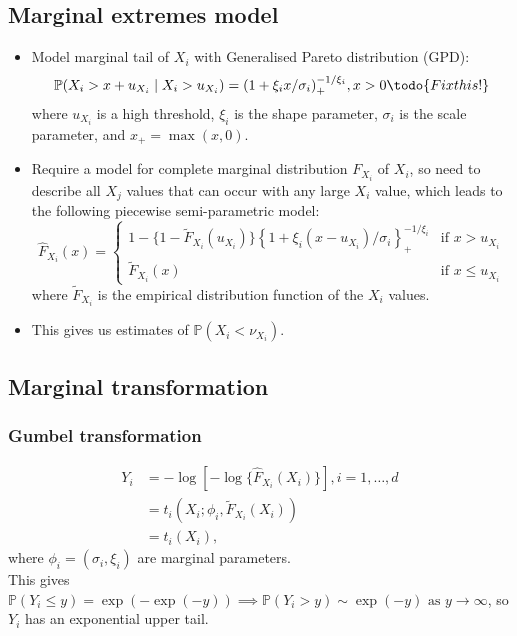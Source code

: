 \documentclass{article}
\begin{document}
\subsection{Marginal extremes model}

\begin{itemize}
  \item Model marginal tail of $X_i$ with Generalised Pareto distribution (GPD):
    \[
      \mathbb{P}(X_i > x + u_{X_i} \mid X_i > u_{X_i}) = {(1 + \xi_ix/\sigma_i)}_{+}^{-1/\xi_i}, x > 0 \todo{Fix this!}
    \]
    where $u_{X_i}$ is a high threshold, $\xi_i$ is the shape parameter, $\sigma_i$ is the scale parameter, and ${x}_{+} = \max(x, 0)$.
  \item Require a model for complete marginal distribution $F_{X_i}$  of $X_i$, so need to describe all $X_j$ values that can occur with any large $X_i$ value, which leads to the following piecewise semi-parametric model:
    \[
      \hat{F}_{X_i}(x) = \begin{cases}
        1 - \{ 1 - \tilde{F}_{X_i}(u_{X_i})\} \left\{1 + \xi_i(x - u_{X_i})/\sigma_i\right\}_{+}^{-1/\xi_i} & \text{if } x > u_{X_i} \\
        \tilde{F}_{X_i}(x) & \text{if } x \le u_{X_i}
      \end{cases}
    \]
    where $\tilde{F}_{X_i}$ is the empirical distribution function of the $X_i$ values. 
  \item This gives us estimates of $\mathbb{P}(X_i < \nu_{X_i})$.
\end{itemize}

\subsection{Marginal transformation}


\subsubsection{Gumbel transformation}

\begin{align*}
  Y_i &= -\log[-\log\{\hat{F}_{X_i}(X_i)\}], i = 1, \ldots, d \\
      &= t_i(X_i; \phi_i, \tilde{F}_{X_i}(X_i)) \\
      &= t_i(X_i),
\end{align*}
where $\phi_i = (\sigma_i, \xi_i)$ are marginal parameters. \\
This gives $\mathbb{P}(Y_i \le y) = \exp(-\exp(-y)) \implies \mathbb{P}(Y_i > y) \sim \exp(-y) \text{ as } y \rightarrow \infty$, so $Y_i$ has an exponential upper tail. 
\end{document}
